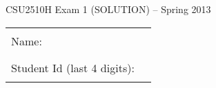 \documentclass[12pt]{article}                   %
\begin{document}
\vspace*{-1.5cm}
\centerline{\Large CSU2510H Exam 1 \ifrubric (SOLUTION) \fi-- Spring 2013}

\vspace{0.5cm}

\ifrubric\relax\else
\begin{center}
\begin{tabular}{l@{\qquad}l}
Name:                        & \rule{174pt}{1pt} \\[.5cm]
Student Id (last 4 digits):  & \rule{174pt}{1pt} \\[.5cm]
\end{tabular}
\end{center}
\fi
\end{document}
